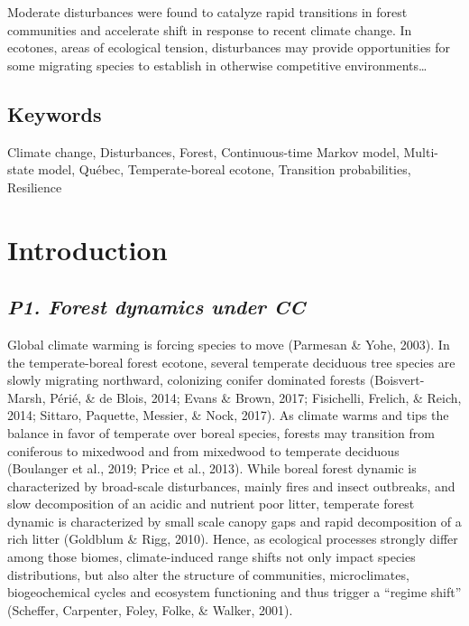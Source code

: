 \documentclass[a4paperpaper,]{article}
\begin{document}
Moderate disturbances were found to catalyze rapid transitions in forest
communities and accelerate shift in response to recent climate change.
In ecotones, areas of ecological tension, disturbances may provide
opportunities for some migrating species to establish in otherwise
competitive environments\ldots{}

\hypertarget{keywords}{%
\subsection{Keywords}\label{keywords}}

Climate change, Disturbances, Forest, Continuous-time Markov model,
Multi-state model, Québec, Temperate-boreal ecotone, Transition
probabilities, Resilience

\pagebreak

\hypertarget{introduction}{%
\section{Introduction}\label{introduction}}

\hypertarget{p1.-forest-dynamics-under-cc}{%
\subsection{\texorpdfstring{\emph{P1. Forest dynamics under
CC}}{P1. Forest dynamics under CC}}\label{p1.-forest-dynamics-under-cc}}

Global climate warming is forcing species to move (Parmesan \& Yohe,
2003). In the temperate-boreal forest ecotone, several temperate
deciduous tree species are slowly migrating northward, colonizing
conifer dominated forests (Boisvert-Marsh, Périé, \& de Blois, 2014;
Evans \& Brown, 2017; Fisichelli, Frelich, \& Reich, 2014; Sittaro,
Paquette, Messier, \& Nock, 2017). As climate warms and tips the balance
in favor of temperate over boreal species, forests may transition from
coniferous to mixedwood and from mixedwood to temperate deciduous
(Boulanger et al., 2019; Price et al., 2013). While boreal forest
dynamic is characterized by broad-scale disturbances, mainly fires and
insect outbreaks, and slow decomposition of an acidic and nutrient poor
litter, temperate forest dynamic is characterized by small scale canopy
gaps and rapid decomposition of a rich litter (Goldblum \& Rigg, 2010).
Hence, as ecological processes strongly differ among those biomes,
climate-induced range shifts not only impact species distributions, but
also alter the structure of communities, microclimates, biogeochemical
cycles and ecosystem functioning and thus trigger a ``regime shift''
(Scheffer, Carpenter, Foley, Folke, \& Walker, 2001).
\end{document}
